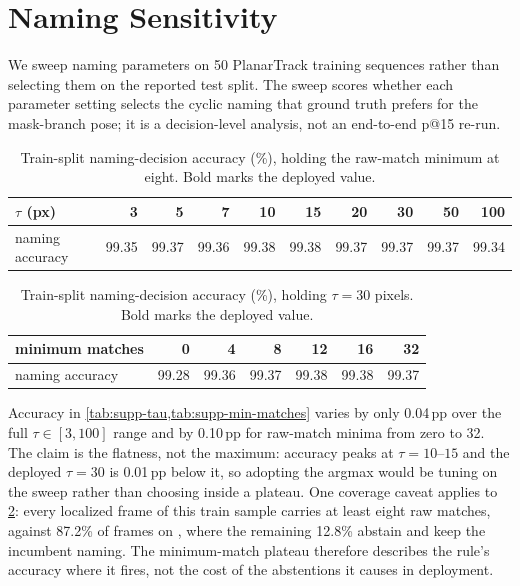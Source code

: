 \section{Naming Sensitivity}
\label{sec:supp-naming}

We sweep naming parameters on 50 PlanarTrack training sequences rather than selecting them on the reported test split.
The sweep scores whether each parameter setting selects the cyclic naming that ground truth prefers for the mask-branch pose; it is a decision-level analysis, not an end-to-end p@15 re-run.

\begin{table}[t]
    \centering
    \setlength{\tabcolsep}{4pt}
    \begin{tabular}{lrrrrrrrrr}
        \toprule
        $\tau$ (px) & 3 & 5 & 7 & 10 & 15 & 20 & \textbf{30} & 50 & 100\\
        \midrule
        naming accuracy & 99.35 & 99.37 & 99.36 & 99.38 & 99.38 & 99.37 & 99.37 & 99.37 & 99.34\\
        \bottomrule
    \end{tabular}
    \caption{Train-split naming-decision accuracy (\%), holding the raw-match minimum at eight.
    Bold marks the deployed value.}
    \label{tab:supp-tau}
\end{table}

\begin{table}[t]
    \centering
    \setlength{\tabcolsep}{4pt}
    \begin{tabular}{lrrrrrr}
        \toprule
        minimum matches & 0 & 4 & \textbf{8} & 12 & 16 & 32\\
        \midrule
        naming accuracy & 99.28 & 99.36 & 99.37 & 99.38 & 99.38 & 99.37\\
        \bottomrule
    \end{tabular}
    \caption{Train-split naming-decision accuracy (\%), holding $\tau=30$ pixels.
    Bold marks the deployed value.}
    \label{tab:supp-min-matches}
\end{table}

Accuracy in \cref{tab:supp-tau,tab:supp-min-matches} varies by only 0.04\,pp over the full $\tau\in[3,100]$ range and by 0.10\,pp for raw-match minima from zero to 32.
The claim is the flatness, not the maximum: accuracy peaks at $\tau=10$--$15$ and the deployed $\tau=30$ is 0.01\,pp below it, so adopting the argmax would be tuning on the sweep rather than choosing inside a plateau.
One coverage caveat applies to \cref{tab:supp-min-matches}: every localized frame of this train sample carries at least eight raw matches, against 87.2\% of frames on \pttst, where the remaining 12.8\% abstain and keep the incumbent naming.
The minimum-match plateau therefore describes the rule's accuracy where it fires, not the cost of the abstentions it causes in deployment.

